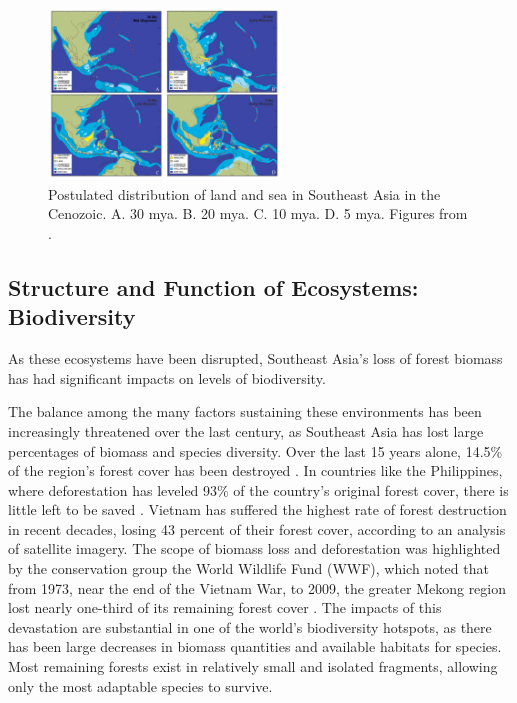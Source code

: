    \begin{figure}[ht]
    \centering
        \includegraphics[width = 0.55\textwidth]{graphics/geology.jpg}
        \caption{Postulated distribution of land and sea in Southeast Asia in the Cenozoic. A. 30 mya. B. 20 mya. C. 10 mya. D. 5 mya. Figures from \cite{hall2002cenozoic}.}
    \end{figure} 

\subsection{Structure and Function of Ecosystems: Biodiversity}

 As these ecosystems have been disrupted, Southeast Asia's loss of forest biomass has had significant impacts on levels of biodiversity. 
 
 The balance among the many factors sustaining these environments has been increasingly threatened over the last century, as Southeast Asia has lost large percentages of biomass and species diversity.  Over the last 15 years alone, 14.5\% of the region's forest cover has been destroyed \citep{gullison2007tropical}.  In countries like the Philippines, where deforestation has leveled 93\% of the country's original forest cover, there is little left to be saved \citep{sodhi2004southeast}. Vietnam has suffered the highest rate of forest destruction in recent decades, losing 43 percent of their forest cover, according to an analysis of satellite imagery. The scope of biomass loss and deforestation was highlighted by the conservation group the World Wildlife Fund (WWF), which noted that from 1973, near the end of the Vietnam War, to 2009, the greater Mekong region lost nearly one-third of its remaining forest cover \citep{sunderland2012evidence}. The impacts of this devastation are substantial in one of the world's biodiversity hotspots, as there has been large decreases in biomass quantities and available habitats for species. Most remaining forests exist in relatively small and isolated fragments, allowing only the most adaptable species to survive.
 


